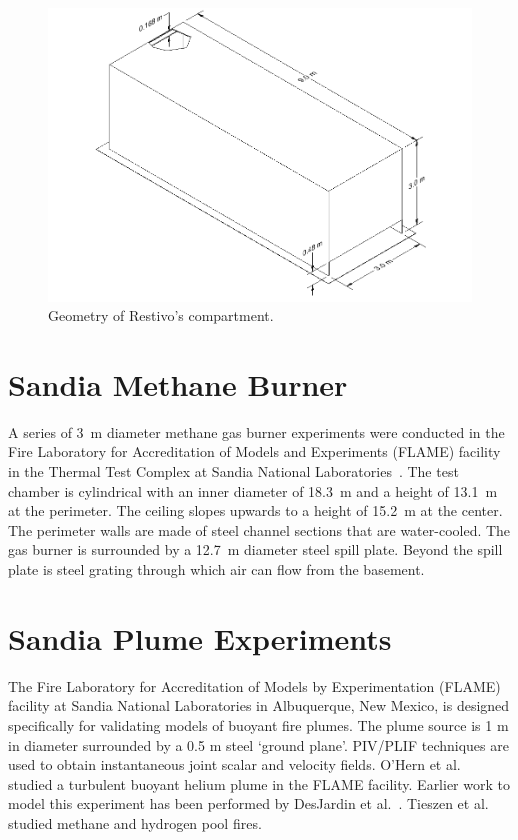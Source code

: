 \begin{figure}[ht]
\includegraphics[width=\textwidth]{FIGURES/Restivo_Experiment/Restivo_Drawing}
\caption[Geometry of Restivo's compartment]{Geometry of Restivo's compartment.}
\label{Restivo_Drawing}
\end{figure}

\section{Sandia Methane Burner}
\label{Sandia_Methane_Burner_Description}

A series of 3~m diameter methane gas burner experiments were conducted in the Fire Laboratory for Accreditation of Models and Experiments (FLAME) facility in the Thermal Test Complex at Sandia National Laboratories~\cite{Blanchat:2011}. The test chamber is cylindrical with an inner diameter of 18.3~m and a height of 13.1~m at the perimeter. The ceiling slopes upwards to a height of 15.2~m at the center. The perimeter walls are made of steel channel sections that are water-cooled. The gas burner is surrounded by a 12.7~m diameter steel spill plate. Beyond the spill plate is steel grating through which air can flow from the basement.


\section{Sandia Plume Experiments}
\label{Sandia_Plume_Description}

The Fire Laboratory for Accreditation of Models by Experimentation (FLAME) facility \cite{OHern:2005,Blanchat:2001} at Sandia National Laboratories in Albuquerque, New Mexico, is designed specifically for validating models of buoyant fire plumes.  The plume source is 1 m in diameter surrounded by a 0.5 m steel `ground plane'. PIV/PLIF techniques are used to obtain instantaneous joint scalar and velocity fields.  O'Hern et al.~\cite{OHern:2005} studied a turbulent buoyant helium plume in the FLAME facility. Earlier work to model this experiment has been performed by DesJardin et al.~\cite{DesJardin:2004}. Tieszen et al.~\cite{Tieszen:2004,Tieszen:2002} studied methane and hydrogen pool fires.

